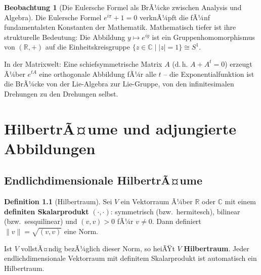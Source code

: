 ﻿\documentclass[a4paper,12pt]{report}
\theoremstyle{definition}
\newtheorem{definition}{Definition}
\newtheorem{beobachtung}{Beobachtung}
\begin{document}
\begin{beobachtung}[Die Eulersche Formel als BrÃ¼cke zwischen Analysis und Algebra]
    Die Eulersche Formel $e^{i\pi} + 1 = 0$ verknÃ¼pft die fÃ¼nf
    fundamentalsten Konstanten der Mathematik. Mathematisch tiefer
    ist ihre strukturelle Bedeutung: Die Abbildung $y \mapsto e^{iy}$
    ist ein Gruppenhomomorphismus von $(\mathbb{R}, +)$ auf die
    Einheitskreisgruppe $\{z \in \mathbb{C} \mid |z| = 1\} \cong S^1$.

    In der Matrixwelt: Eine schiefsymmetrische Matrix $A$ (d.\,h. $A + A^t = 0$)
    erzeugt Ã¼ber $e^{tA}$ eine orthogonale Abbildung fÃ¼r alle $t$ --
    die Exponentialfunktion ist die BrÃ¼cke von der Lie-Algebra zur
    Lie-Gruppe, von den infinitesimalen Drehungen zu den Drehungen selbst.
\end{beobachtung}

\chapter{HilbertrÃ¤ume und adjungierte Abbildungen}

\section{Endlichdimensionale HilbertrÃ¤ume}

\begin{definition}[Hilbertraum]
    Sei $V$ ein Vektorraum Ã¼ber $\mathbb{R}$ oder $\mathbb{C}$ mit einem
    \textbf{definiten Skalarprodukt} $(\cdot, \cdot)$: symmetrisch (bzw.\
    hermitesch), bilinear (bzw.\ sesquilinear) und $(v,v) > 0$ fÃ¼r $v \neq 0$.
    Dann definiert $\|v\| = \sqrt{(v,v)}$ eine Norm.

    Ist $V$ vollstÃ¤ndig bezÃ¼glich dieser Norm, so heiÃŸt $V$
    \textbf{Hilbertraum}. Jeder endlichdimensionale Vektorraum mit
    definitem Skalarprodukt ist automatisch ein Hilbertraum.
\end{definition}
\end{document}
